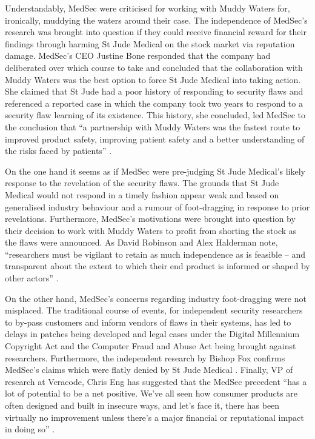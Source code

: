 \documentclass{svjour3}                     %
\begin{document}
Understandably, MedSec were criticised for working with Muddy Waters for, ironically, muddying the waters around their case. The independence of MedSec’s research was brought into question if they could receive financial reward for their findings through harming St Jude Medical on the stock market via reputation damage. MedSec’s CEO Justine Bone responded that the company had deliberated over which course to take and concluded that the collaboration with Muddy Waters was the best option to force St Jude Medical into taking action.  She claimed that St Jude had a poor history of responding to security flaws and referenced a reported case in which the company took two years to respond to a security flaw learning of its existence.  This history, she concluded, led MedSec to the conclusion that ``a partnership with Muddy Waters was the fastest route to improved product safety, improving patient safety and a better understanding of the risks faced by patients'' \cite{weigelt16jude}. 

On the one hand it seems as if MedSec were pre-judging St Jude Medical’s likely response to the revelation of the security flaws. The grounds that St Jude Medical would not respond in a timely fashion appear weak and based on generalised industry behaviour and a rumour of foot-dragging in response to prior revelations. Furthermore, MedSec’s motivations were brought into question by their decision to work with Muddy Waters to profit from shorting the stock as the flaws were announced. As David Robinson and Alex Halderman note, ``researchers must be vigilant to retain as much independence as is feasible – and transparent about the extent to which their end product is informed or shaped by other actors'' \cite[p.~122]{robinson2011ethical}.

On the other hand, MedSec’s concerns regarding industry foot-dragging were not misplaced. The traditional course of events, for independent security researchers to by-pass customers and inform vendors of flaws in their systems, has led to delays in patches being developed and legal cases under the Digital Millennium Copyright Act and the Computer Fraud and Abuse Act being brought against researchers. Furthermore, the independent research by Bishop Fox confirms MedSec’s claims which were flatly denied by St Jude Medical \cite{weigelt16jude}. Finally, VP of research at Veracode, Chris Eng has suggested that the MedSec precedent ``has a lot of potential to be a net positive. We’ve all seen how consumer products are often designed and built in insecure ways, and let’s face it, there has been virtually no improvement unless there’s a major financial or reputational impact in doing so'' \cite{spring16medsec}.
\end{document}

